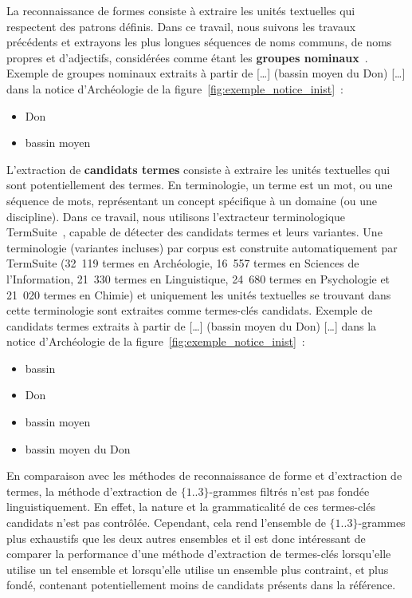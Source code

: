     La reconnaissance de formes consiste à extraire les unités textuelles qui
    respectent des patrons définis. Dans ce travail, nous suivons les travaux
    précédents et extrayons les plus longues séquences de noms communs, de noms
    propres et d'adjectifs, considérées comme étant les \textbf{groupes
    nominaux}~\cite{hassan2010conundrums}. Exemple de groupes nominaux extraits
    à partir de \og{}[\dots] (bassin moyen du Don) [\dots]\fg{} dans la notice
    d'Archéologie de la figure~\ref{fig:exemple_notice_inist}~:
    \begin{itemize}
      \item{\og{}Don\fg{}}
      \item{\og{}bassin moyen\fg{}}
    \end{itemize}

    L'extraction de \textbf{candidats termes} consiste à extraire les unités
    textuelles qui sont potentiellement des termes. En terminologie, un terme
    est un mot, ou une séquence de mots, représentant un concept spécifique à un
    domaine (ou une discipline). Dans ce travail, nous utilisons l'extracteur
    terminologique TermSuite~\cite{rocheteau2011termsuite}, capable de détecter
    des candidats termes et leurs variantes. Une terminologie (variantes
    incluses) par corpus est construite automatiquement par TermSuite (32~119
    termes en Archéologie, 16~557 termes en Sciences de l'Information, 21~330
    termes en Linguistique, 24~680 termes en Psychologie et 21~020 termes en
    Chimie) et uniquement les unités textuelles se trouvant dans cette
    terminologie sont extraites comme termes-clés candidats. Exemple de
    candidats termes extraits à partir de \og{}[\dots] (bassin moyen du Don)
    [\dots]\fg{} dans la notice d'Archéologie de la
    figure~\ref{fig:exemple_notice_inist}~:
    \begin{itemize}
      \item{\og{}bassin\fg{}}
      \item{\og{}Don\fg{}}
      \item{\og{}bassin moyen\fg{}}
      \item{\og{}bassin moyen du Don\fg{}}
    \end{itemize}
    
    En comparaison avec les méthodes de reconnaissance de forme et d'extraction
    de termes, la méthode d'extraction de $\{1..3\}$-grammes filtrés n'est pas
    fondée linguistiquement. En effet, la nature et la grammaticalité de ces
    termes-clés candidats n'est pas contrôlée. Cependant, cela rend l'ensemble
    de $\{1..3\}$-grammes plus exhaustifs que les deux autres ensembles et il
    est donc intéressant de comparer la performance d'une méthode d'extraction
    de termes-clés lorsqu'elle utilise un tel ensemble et lorsqu'elle utilise un
    ensemble plus contraint, et plus fondé, contenant potentiellement moins de
    candidats présents dans la référence.

